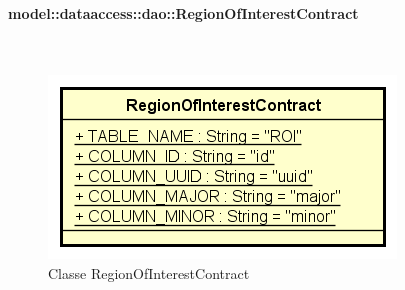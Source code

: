 \documentclass[../DefinizioneDiProdotto.tex]{subfiles}
\begin{document}
\paragraph{model::dataaccess::dao::RegionOfInterestContract}
\
\begin{figure}[H]
	\centering
	\includegraphics[width=\maxwidth]{img/RegionOfInterestContract.png}
	\caption{Classe RegionOfInterestContract}\label{fig:model::dataaccess::dao::RegionOfInterestContract} 
\end{figure}
\end{document}
